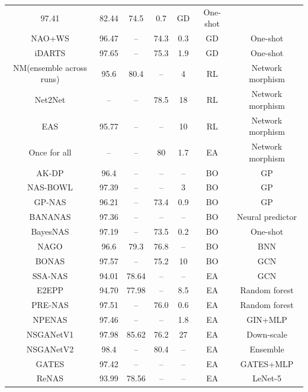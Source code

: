 \documentclass[journal]{IEEEtran}
\begin{document}
\begin{table}[]
\begin{tabular}{ccccccc}
  97.41 &
  82.44 &
  74.5 &
  0.7 &
  GD &
  One-shot \\
NAO+WS \cite{guo2021towards} &
  96.47 &
  -- &
  74.3 &
  0.3 &
  GD &
  One-shot \\
iDARTS \cite{9525822} &
  97.65 &
  -- &
  75.3 &
  1.9 &
  GD &
  One-shot \\ \hline
NM(ensemble across runs) \cite{elsken2017simple} &
  95.6 &
  80.4 &
  -- &
  4 &
  RL &
  Network   morphism \\
Net2Net \cite{chen2015net2net} &
  -- &
  -- &
  78.5 &
  18 &
  RL &
  Network   morphism \\
EAS \cite{cai2018efficient} &
  95.77 &
  -- &
  -- &
  10 &
  RL &
  Network   morphism \\
Once for all \cite{cai2019once} &
  -- &
  -- &
  80 &
  1.7 &
  EA &
  Network   morphism \\ \hline
AK-DP \cite{jin2019auto} &
  96.4 &
  -- &
  -- &
  -- &
  BO &
  GP \\
NAS-BOWL   \cite{ru2020interpretable} &
  97.39 &
  -- &
  -- &
  3 &
  BO &
  GP \\
GP-NAS \cite{li2020gp} &
  96.21 &
  -- &
  73.4 &
  0.9 &
  BO &
  GP \\
BANANAS \cite{white2021bananas} &
  97.36 &
  -- &
  -- &
  -- &
  BO &
  Neural   predictor \\
BayesNAS   \cite{zhou2019bayesnas} &
  97.19 &
  -- &
  73.5 &
  0.2 &
  BO &
  One-shot \\
NAGO   \cite{ru2020neural} &
  96.6 &
  79.3 &
  76.8 &
  -- &
  BO &
  BNN \\
BONAS   \cite{shi2020bridging} &
  97.57 &
  -- &
  75.2 &
  10 &
  BO &
  GCN \\
SSA-NAS \cite{tang2020semi} &
  94.01 &
  78.64 &
  -- &
  -- &
  EA &
  GCN \\
E2EPP   \cite{sun2019surrogate} &
  94.70 &
  77.98 &
  -- &
  8.5 &
  EA &
  Random forest \\
PRE-NAS   \cite{peng2022pre} &
  97.51 &
  -- &
  76.0 &
  0.6 &
  EA &
  Random   forest \\
NPENAS   \cite{wei2020npenas} &
  97.46 &
  -- &
  -- &
  1.8 &
  EA &
  GIN+MLP \\
NSGANetV1   \cite{lu2020multi} &
  97.98 &
  85.62 &
  76.2 &
  27 &
  EA &
  Down-scale \\
NSGANetV2  \cite{lu2020nsganetv2} &
  98.4 &
  -- &
  80.4 &
  -- &
  EA &
  Ensemble \\
GATES \cite{ning2020generic} &
  97.42 &
  -- &
  -- &
  -- &
  EA &
  GATES+MLP \\
  ReNAS \cite{xu2021renas} &
  93.99 &
  78.56 &
  -- &
  -- &
  EA &
  LeNet-5 \\  \hline
\end{tabular}
\end{table}
\end{document}
